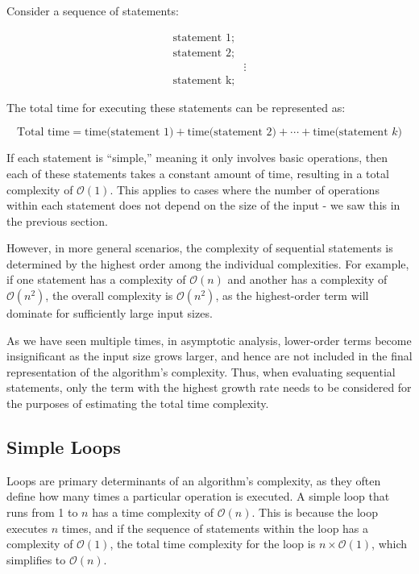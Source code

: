 Consider a sequence of statements:

\begin{align*}
    \text{statement 1;} \\
    \text{statement 2;} \\
    & \vdots \\
    \text{statement k;}
\end{align*}

The total time for executing these statements can be represented as:

\[
\text{Total time} = \text{time(statement 1)} + \text{time(statement 2)} + \cdots + \text{time(statement } k) 
\]

If each statement is “simple,” meaning it only involves basic operations, then each of these statements takes a constant amount of time, resulting in a total complexity of $\mathcal{O}(1)$. This applies to cases where the number of operations within each statement does not depend on the size of the input - we saw this in the previous section.

However, in more general scenarios, the complexity of sequential statements is determined by the highest order among the individual complexities. For example, if one statement has a complexity of $\mathcal{O}(n)$ and another has a complexity of $\mathcal{O}(n^2)$, the overall complexity is $\mathcal{O}(n^2)$, as the highest-order term will dominate for sufficiently large input sizes.

As we have seen multiple times, in asymptotic analysis, lower-order terms become insignificant as the input size grows larger, and hence are not included in the final representation of the algorithm's complexity. Thus, when evaluating sequential statements, only the term with the highest growth rate needs to be considered for the purposes of estimating the total time complexity.

\subsection*{Simple Loops}

Loops are primary determinants of an algorithm's complexity, as they often define how many times a particular operation is executed. A simple loop that runs from 1 to $n$ has a time complexity of $\mathcal{O}(n)$. This is because the loop executes $n$ times, and if the sequence of statements within the loop has a complexity of $\mathcal{O}(1)$, the total time complexity for the loop is $n \times \mathcal{O}(1)$, which simplifies to $\mathcal{O}(n)$. 

